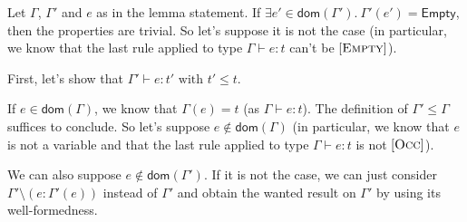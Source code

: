 \documentclass[a4paper]{article}%
\newcommand{\dom}[1]{\textsf{dom}(#1)}
\newcommand{\Empty} {\textsf{Empty}}%
\theoremstyle{definition}
\newcommand {\Rule}[1] {[\textsc{#1}]}
\begin{document}
        Let $\Gamma$, $\Gamma'$ and $e$ as in the lemma statement.
        If $\exists e' \in \dom {\Gamma'}.\ \Gamma'(e') = \Empty$, then the properties are trivial.
        So let's suppose it is not the case (in particular, we know that the last rule applied to type $\Gamma \vdash e:t$ can't be $\Rule{Empty}$).
    
        First, let's show that $\Gamma' \vdash e:t' \text{ with } t' \leq t$.
    
        If $e\in\dom\Gamma$, we know that $\Gamma(e)=t$ (as $\Gamma \vdash e:t$). The definition of $\Gamma' \leq \Gamma$ suffices to conclude.
        So let's suppose $e\not\in\dom\Gamma$ (in particular, we know that $e$ is not a variable and that the last rule applied to type $\Gamma \vdash e:t$ is not $\Rule{Occ}$).
    
        We can also suppose $e\not\in\dom{\Gamma'}$. If it is not the case, we can just consider $\Gamma'\setminus(e:\Gamma'(e))$ instead of $\Gamma'$
        and obtain the wanted result on $\Gamma'$ by using its well-formedness.
\end{document}

